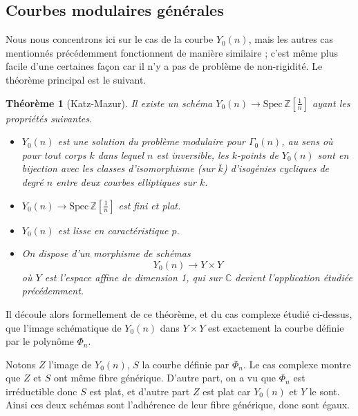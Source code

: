 \documentclass[11pt,a4paper]{article}
\newcommand{\Z}{\mathbb{Z}}
\newcommand{\C}{\mathbb{C}}
\newcommand{\vers}{\rightarrow}
\newcommand{\Spec}{\mathrm{Spec}\,}
\newtheorem*{thm}{Théorème}
\theoremstyle{definition}
\begin{document}
\newpage

\subsection{Courbes modulaires générales}


Nous nous concentrons ici sur le cas de la courbe $Y_0(n)$, mais les autres cas mentionnés précédemment fonctionnent de manière similaire ; c'est même plus facile d'une certaines façon car il n'y a pas de problème de non-rigidité. Le théorème principal est le suivant.

\begin{thm}[Katz-Mazur]
Il existe un schéma $Y_0(n)\vers \Spec \Z\left[\frac{1}{n}\right]$ ayant les propriétés suivantes.

\begin{itemize}

\item[(i)] $Y_0(n)$ est une solution du problème modulaire pour $\Gamma_0(n)$, au sens où pour tout corps $k$ dans lequel $n$ est inversible, les $k$-points de $Y_0(n)$ sont en bijection avec les classes d'isomorphisme (sur $\bar{k}$) d'isogénies cycliques de degré $n$ entre deux courbes elliptiques sur $k$.

\item[(ii)] $Y_0(n)\vers \Spec \Z\left[\frac{1}{n}\right]$ est fini et plat.

\item[(iii)] $Y_0(n)$ est lisse en caractéristique $p$.

\item[(iv)] On dispose d'un morphisme de schémas 
$$Y_0(n) \vers Y\times Y$$
où $Y$ est l'espace affine de dimension 1, qui sur $\C$ devient l'application étudiée précédemment.

\end{itemize}

\end{thm}

Il découle alors formellement de ce théorème, et du cas complexe étudié ci-dessus, que l'image schématique de $Y_0(n)$ dans $Y\times Y$ est exactement la courbe définie par le polynôme $\Phi_n$.

Notons $Z$ l'image de $Y_0(n)$, $S$ la courbe définie par $\Phi_n$. Le cas complexe montre que $Z$ et $S$ ont même fibre générique. D'autre part, on a vu que $\Phi_n$ est irréductible donc $S$ est plat, et d'autre part $Z$ est plat car $Y_0(n)$ et $Y$ le sont. Ainsi ces deux schémas sont l'adhérence de leur fibre générique, donc sont égaux.
\end{document}
